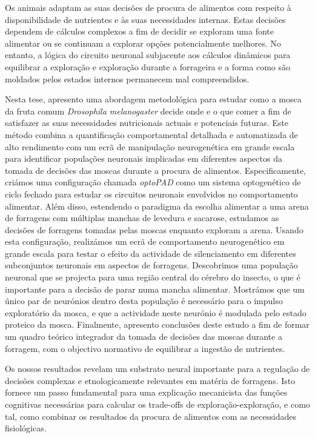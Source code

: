 
%

Os animais adaptam as suas decisões de procura de alimentos com respeito à disponibilidade de nutrientes e às suas necessidades internas. Estas decisões dependem de cálculos complexos a fim de decidir se exploram uma fonte alimentar ou se continuam a explorar opções potencialmente melhores. No entanto, a lógica do circuito neuronal subjacente aos cálculos dinâmicos para equilibrar a exploração e exploração durante a forrageira e a forma como são moldados pelos estados internos permanecem mal compreendidos.

\indent Nesta tese, apresento uma abordagem metodológica para estudar como a mosca da fruta comum \textit{Drosophila melanogaster} decide onde e o que comer a fim de satisfazer as suas necessidades nutricionais actuais e potenciais futuras. Este método combina a quantificação comportamental detalhada e automatizada de alto rendimento com um ecrã de manipulação neurogenética em grande escala para identificar populações neuronais implicadas em diferentes aspectos da tomada de decisões das moscas durante a procura de alimentos. Especificamente, criámos uma configuração chamada \textit{optoPAD} como um sistema optogenético de ciclo fechado para estudar os circuitos neuronais envolvidos no comportamento alimentar. Além disso, estendendo o paradigma da escolha alimentar a uma arena de forragens com múltiplas manchas de levedura e sacarose, estudamos as decisões de forragens tomadas pelas moscas enquanto exploram a arena. Usando esta configuração, realizámos um ecrã de comportamento neurogenético em grande escala para testar o efeito da actividade de silenciamento em diferentes subconjuntos neuronais em aspectos de forragens. Descobrimos uma população neuronal que se projecta para uma região central do cérebro do insecto, o que é importante para a decisão de parar numa mancha alimentar. Mostrámos que um único par de neurónios dentro desta população é necessário para o impulso exploratório da mosca, e que a actividade neste neurónio é modulada pelo estado proteico da mosca. Finalmente, apresento conclusões deste estudo a fim de formar um quadro teórico integrador da tomada de decisões das moscas durante a forragem, com o objectivo normativo de equilibrar a ingestão de nutrientes.

\indent Os nossos resultados revelam um substrato neural importante para a regulação de decisões complexas e etnologicamente relevantes em matéria de forragens. Isto fornece um passo fundamental para uma explicação mecanicista das funções cognitivas necessárias para calcular os trade-offs de exploração-exploração, e como tal, como combinar os resultados da procura de alimentos com as necessidades fisiológicas.

